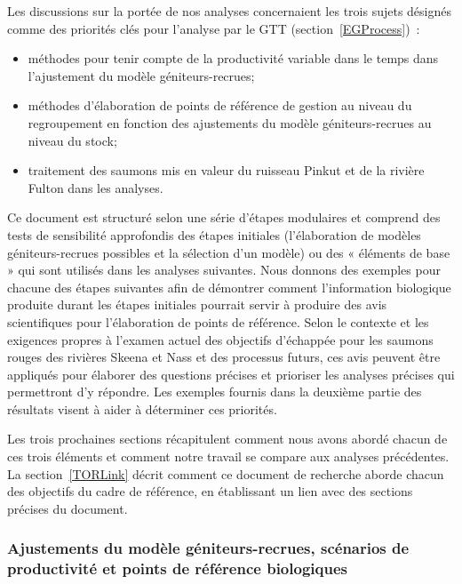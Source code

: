 \documentclass[french,11pt]{book}
\begin{document}
Les discussions sur la portée de nos analyses concernaient les trois sujets désignés comme des priorités clés pour l'analyse par le GTT (section~\ref{EGProcess})~:
\begin{itemize}

\item
  méthodes pour tenir compte de la productivité variable dans le temps dans l'ajustement du modèle géniteurs-recrues;
\item
  méthodes d'élaboration de points de référence de gestion au niveau du regroupement en fonction des ajustements du modèle géniteurs-recrues au niveau du stock;
\item
  traitement des saumons mis en valeur du ruisseau Pinkut et de la rivière Fulton dans les analyses.
\end{itemize}
Ce document est structuré selon une série d'étapes modulaires et comprend des tests de sensibilité approfondis des étapes initiales (l'élaboration de modèles géniteurs-recrues possibles et la sélection d'un modèle) ou des « éléments de base » qui sont utilisés dans les analyses suivantes. Nous donnons des exemples pour chacune des étapes suivantes afin de démontrer comment l'information biologique produite durant les étapes initiales pourrait servir à produire des avis scientifiques pour l'élaboration de points de référence. Selon le contexte et les exigences propres à l'examen actuel des objectifs d'échappée pour les saumons rouges des rivières Skeena et Nass et des processus futurs, ces avis peuvent être appliqués pour élaborer des questions précises et prioriser les analyses précises qui permettront d'y répondre. Les exemples fournis dans la deuxième partie des résultats visent à aider à déterminer ces priorités.

Les trois prochaines sections récapitulent comment nous avons abordé chacun de ces trois éléments et comment notre travail se compare aux analyses précédentes. La section~\ref{TORLink} décrit comment ce document de recherche aborde chacun des objectifs du cadre de référence, en établissant un lien avec des sections précises du document.

\subsubsection{Ajustements du modèle géniteurs-recrues, scénarios de productivité et points de référence biologiques}\label{AnalysisOverviewSR}
\end{document}
